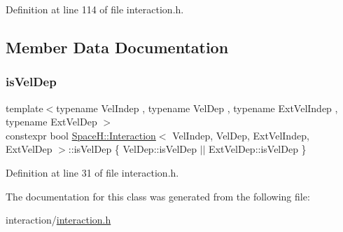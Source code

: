 Definition at line 114 of file interaction.\+h.



\subsection{Member Data Documentation}
\mbox{\label{class_space_h_1_1_interaction_ac2c52753e6cf7f9040d710345caf7635}} 
\subsubsection{\texorpdfstring{is\+Vel\+Dep}{isVelDep}}
{\footnotesize\ttfamily template$<$typename Vel\+Indep , typename Vel\+Dep , typename Ext\+Vel\+Indep , typename Ext\+Vel\+Dep $>$ \\
constexpr bool \mbox{\hyperlink{class_space_h_1_1_interaction}{Space\+H\+::\+Interaction}}$<$ Vel\+Indep, Vel\+Dep, Ext\+Vel\+Indep, Ext\+Vel\+Dep $>$\+::is\+Vel\+Dep \{ Vel\+Dep\+::is\+Vel\+Dep $\vert$$\vert$ Ext\+Vel\+Dep\+::is\+Vel\+Dep \}\hspace{0.3cm}{\ttfamily [static]}}



Definition at line 31 of file interaction.\+h.



The documentation for this class was generated from the following file\+:\begin{DoxyCompactItemize}
\item 
interaction/\mbox{\hyperlink{interaction_8h}{interaction.\+h}}\end{DoxyCompactItemize}
